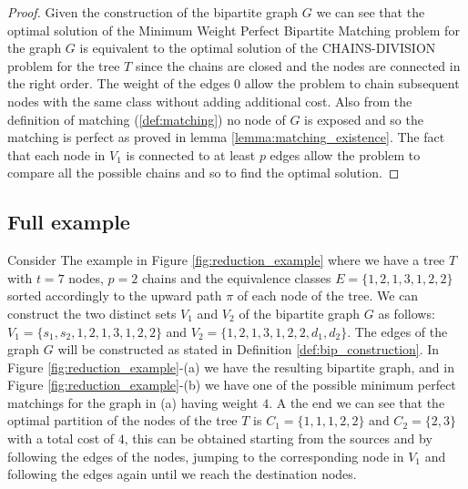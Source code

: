 \begin{proof}
    Given the construction of the bipartite graph $G$ we can see that the optimal solution of the Minimum Weight Perfect Bipartite Matching problem for the graph $G$ is equivalent to the optimal solution of the \textsc{CHAINS-DIVISION} problem for the tree $T$ since the chains are closed and the nodes are connected in the right order. The weight of the edges $0$ allow the problem to chain subsequent nodes with the same class without adding additional cost. Also from the definition of matching (\ref{def:matching}) no node of $G$ is exposed and so the matching is perfect as proved in lemma \ref{lemma:matching_existence}. The fact that each node in $V_1$ is connected to at least $p$ edges allow the problem to compare all the possible chains and so to find the optimal solution.
\end{proof}

\subsection{Full example}
Consider The example in Figure \ref{fig:reduction_example} where we have a tree $T$ with $t=7$ nodes, $p = 2$ chains and the equivalence classes $E = \{1,2,1,3,1,2,2\}$ sorted accordingly to the upward path $\pi$ of each node of the tree. We can construct the two distinct sets $V_1$ and $V_2$ of the bipartite graph $G$ as follows: $V_1 = \{s_1, s_2, 1,2,1,3,1,2,2\}$ and $V_2 = \{1,2,1,3,1,2,2, d_1, d_2\}$. The edges of the graph $G$ will be constructed as stated in Definition \ref{def:bip_construction}. In Figure \ref{fig:reduction_example}-(a) we have the resulting bipartite graph, and in Figure \ref{fig:reduction_example}-(b) we have one of the possible minimum perfect matchings for the graph in (a) having weight $4$. A the end we can see that the optimal partition of the nodes of the tree $T$ is $C_1 = \{1,1,1,2,2\}$ and $C_2 = \{2,3\}$ with a total cost of $4$, this can be obtained starting from the sources and by following the edges of the nodes, jumping to the corresponding node in $V_1$ and following the edges again until we reach the destination nodes.

